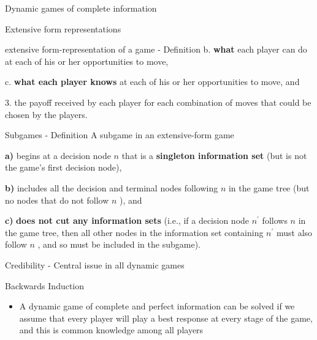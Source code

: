 \begin{titleboxchi}{Dynamic games of complete information}
\begin{proposition}{Extensive form representations}
\begin{definition}{extensive form-representation of a game - Definition}
            b.
            \textbf{what} each player can do at each of his or her opportunities to move,
            
            c.
            \textbf{what each player knows} at each of his or her opportunities to move, and
            
            3.
            the payoff received by each player for each combination of moves that could be chosen by the players.
        \end{definition}
    \end{proposition}
    
    \begin{definition}{Subgames - Definition}
        A subgame in an extensive-form game
        
        \textbf{a)} begins at a decision node $n$
        that is a \textbf{singleton information set} (but is not the game's first decision node),
        
        \textbf{ b)} includes all the decision and terminal nodes following $n$
        in the game tree (but no nodes that do not follow
        $n$ ), and
        
        \textbf{c)} \textbf{does not cut any information sets} (i.e., if a decision node $n^{\prime}$ follows $n$
        in the game tree, then all other nodes in the information set containing $n^{\prime}$ must also follow $n$
        , and so must be included in the subgame).

    
    \end{definition}
    
     \begin{titleboxnarrow}{Credibility - Central issue in all dynamic games}
    
    \end{titleboxnarrow}
    
    \begin{definition}{Backwards Induction}
        \begin{itemize}
            \item A dynamic game of complete and perfect information can be solved if we assume that every player will play a best response at every stage of the game, and this is common knowledge among all players
        \end{itemize}
    

\end{definition}
\end{titleboxchi}
